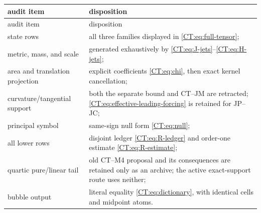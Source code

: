 \begin{center}
\begin{longtable}{>{\raggedright\arraybackslash}p{.30\linewidth}
                  >{\raggedright\arraybackslash}p{.58\linewidth}}
\toprule
audit item & disposition\\
\midrule
\endfirsthead
\toprule
audit item & disposition\\
\midrule
\endhead
state rows & all three families displayed in \eqref{CT:eq:full-tensor};\\
metric, mass, and scale & generated exhaustively by
\eqref{CT:eq:J-jets}--\eqref{CT:eq:H-jets};\\
area and translation projection & explicit coefficients
\eqref{CT:eq:chi}, then exact kernel cancellation;\\
curvature/tangential support & both the separate bound and CT--JM are
retracted; \eqref{CT:eq:effective-leading-forcing} is retained for JP--JC;\\
principal symbol & same-sign null form \eqref{CT:eq:null};\\
all lower rows & disjoint ledger \eqref{CT:eq:R-ledger} and
order-one estimate \eqref{CT:eq:R-estimate};\\
quartic pure/linear tail & old CT--M4 proposal and its consequences are
retained only as an archive; the active exact-support route uses neither;\\
bubble output & literal equality \eqref{CT:eq:dictionary}, with identical
cells and midpoint atoms.\\
\bottomrule
\end{longtable}
\end{center}
\endgroup
